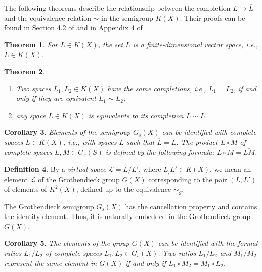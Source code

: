 \documentclass[11pt]{article}
\theoremstyle{plain}
\newtheorem{theorem}{Theorem}[section]
\newtheorem{corollary}[theorem]{Corollary}
\theoremstyle{definition}
\newtheorem{definition}[theorem]{Definition}
\begin{document}
The following theorems describe the relationship between
the completion  $L\to \overline  L$  and the equivalence relation $\sim$ in the semigroup $K(X)$. Their proofs can be found in Section 4.2 of \cite{K-K12} and in Appendix 4 of \cite{ZarS}.

\begin{theorem} For $L\in K(X)$, the  set $\overline{L}$ is a finite-dimensional   vector space, i.e., $\overline{L}\in K(X)$.
\end{theorem}


\begin{theorem} \begin{enumerate}
\item Two spaces $L_1,L_2\in K(X)$ have the same completions, i.e.,  $\overline{L}_1 = \overline{L}_2$, if and only if they are equivalent $L_1\sim L_2$;
\item any space $L\in K(X)$ is equivalents to its completion $L\sim \overline{L} $.
\end{enumerate}
\end{theorem}



\begin{corollary} Elements of the semigroup $G_s(X)$ can be identified with complete spaces $L\in K(X)$, i.e., with  spaces $L$ such that $\overline{L}=L$. The product  $L\circ M$  of  complete spaces $L,M\in G_s(S)$ is defined by the following formula: $L \circ M=\overline{LM}$.
\end{corollary}



\begin{definition} By a {\it virtual space} $\mathcal L=L/L'$, where $L_, L'\in K(X)$, we mean an element  $\mathcal L$ of the Grothendieck group $G(X)$ corresponding to the pair $(L,L')$ of elements of $K^2(X)$, defined up to the equivalence $\sim_g$.
\end{definition}


The Grothendieck semigroup $G_s(X)$ has the cancellation property and contains the identity element. Thus, it is naturally embedded in the Grothendieck group $G(X)$.

\begin{corollary}
The elements of the group $G(X)$ can be identified with the formal ratios $L_1/L_2$ of complete spaces $L_1,L_2\in G_s(X)$. Two ratios $L_1/L_2$ and $M_1/M_2$ represent the same element in $G(X)$ if and only if $L_1 \circ  M_2 = M_1\circ L_2$.
\end{corollary}
\end{document}
